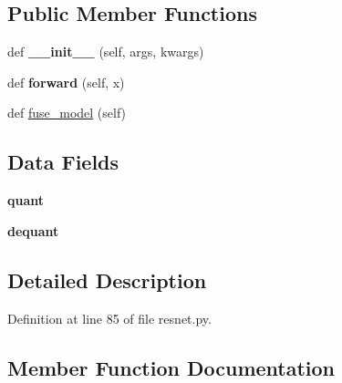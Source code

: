 \subsection*{Public Member Functions}
\begin{DoxyCompactItemize}
\item 
\mbox{\label{classtorchvision_1_1models_1_1quantization_1_1resnet_1_1QuantizableResNet_acedde4768f9d7f3555316fb5a89935ea}} 
def {\bfseries \+\_\+\+\_\+init\+\_\+\+\_\+} (self, args, kwargs)
\item 
\mbox{\label{classtorchvision_1_1models_1_1quantization_1_1resnet_1_1QuantizableResNet_a72d88686cc1c47e0629f21ded13ecd3a}} 
def {\bfseries forward} (self, x)
\item 
def \hyperlink{classtorchvision_1_1models_1_1quantization_1_1resnet_1_1QuantizableResNet_abca804378ddac17f0d8b980ea00c9faa}{fuse\+\_\+model} (self)
\end{DoxyCompactItemize}
\subsection*{Data Fields}
\begin{DoxyCompactItemize}
\item 
\mbox{\label{classtorchvision_1_1models_1_1quantization_1_1resnet_1_1QuantizableResNet_aa9717ab00dcc1b189f75a990adf4735d}} 
{\bfseries quant}
\item 
\mbox{\label{classtorchvision_1_1models_1_1quantization_1_1resnet_1_1QuantizableResNet_a7963ea21d289717ba219d560fc073d19}} 
{\bfseries dequant}
\end{DoxyCompactItemize}


\subsection{Detailed Description}


Definition at line 85 of file resnet.\+py.



\subsection{Member Function Documentation}
\mbox{\label{classtorchvision_1_1models_1_1quantization_1_1resnet_1_1QuantizableResNet_abca804378ddac17f0d8b980ea00c9faa}} 
